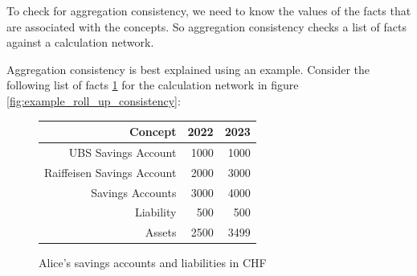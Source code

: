 To check for aggregation consistency, we need to know the values of the facts that are associated with the concepts.
So aggregation consistency checks a list of facts against a calculation network.

Aggregation consistency is best explained using an example.
Consider the following list of facts \ref{fig:example_facts_aggregation_consistency} for the calculation network in figure \ref{fig:example_roll_up_consistency}:


\begin{figure}[H]
    \caption{Alice's savings accounts and liabilities in CHF}
    \label{fig:example_facts_aggregation_consistency}
    \centering 
    \begin{tabular}{|r|r|r|}
        \hline
        \textbf{Concept} & \textbf{2022} & \textbf{2023} \\ \hline
        UBS Savings Account & 1000 & 1000 \\ \hline
        Raiffeisen Savings Account & 2000 & 3000 \\ \hline
        Savings Accounts & 3000 & 4000 \\ \hline
        Liability & 500 & 500 \\ \hline
        Assets & 2500 & 3499 \\ \hline
    \end{tabular}
\end{figure}

